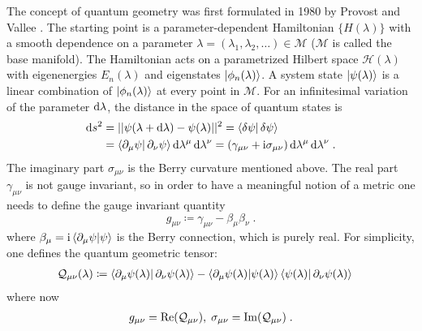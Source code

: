 \documentclass[../main.tex]{subfiles}
\begin{document}
The concept of quantum geometry was first formulated in 1980 by Provost and Vallee \cite{provostRiemannianStructureManifolds1980}.
The starting point is a parameter-dependent Hamiltonian \(\{H(\lambda)\}\) with a smooth dependence on a parameter \(\lambda = (\lambda_1, \lambda_2, \ldots) \in \mathcal{M}\) (\(\mathcal{M}\) is called the base manifold).
The Hamiltonian acts on a parametrized Hilbert space \(\mathcal{H} (\lambda)\) with eigenenergies \(E_n (\lambda)\) and eigenstates \(\ket{\phi_n (\lambda)}\).
A system state \(\ket{\psi (\lambda)}\) is a linear combination of \(\ket{\phi_n (\lambda)}\) at every point in \(\mathcal{M}\).
For an infinitesimal variation of the parameter \(\odif{\lambda}\), the distance in the space of quantum states is
\begin{align}
	\odif{s^2} &= \vert\vert \psi (\lambda + \odif{\lambda}) - \psi (\lambda) \vert \vert^2 = \braket{\fdif{\psi} | \fdif{\psi}} \\
	&= \braket{\pdif{\mu} \psi | \pdif{\nu} \psi} \odif{\lambda^{\mu}} \odif{\lambda^{\nu}} = (\gamma_{\mu \nu} + \iu \sigma_{\mu \nu}) \odif{\lambda^{\mu}} \odif{\lambda^{\nu}} \;.
\end{align}
The imaginary part \(\sigma_{\mu \nu}\) is the Berry curvature mentioned above.
The real part \(\gamma_{\mu \nu}\) is not gauge invariant, so in order to have a meaningful notion of a metric one needs to define the gauge invariant quantity
\begin{equation}
	g_{\mu \nu} \coloneq \gamma_{\mu \nu} - \beta_{\mu} \beta_{\nu} \;.
\end{equation}
where \(\beta_{\mu} = \iu \braket{\pdif{\mu} \psi | \psi}\) is the Berry connection, which is purely real.
For simplicity, one defines the quantum geometric tensor:
\begin{align}
	\mathcal{Q}_{\mu \nu} (\lambda) &\coloneq \braket{\pdif{\mu} \psi (\lambda) | \pdif{\nu} \psi (\lambda)} - \braket{\pdif{\mu} \psi (\lambda) | \psi (\lambda)} \braket{\psi (\lambda) | \pdif{\nu} \psi (\lambda)}
\end{align}
where now
\begin{align}
	g_{\mu \nu} = \mathrm{Re}(\mathcal{Q}_{\mu \nu}),\;\sigma_{\mu \nu} = \mathrm{Im}(\mathcal{Q}_{\mu \nu})\;.
\end{align}
\end{document}
